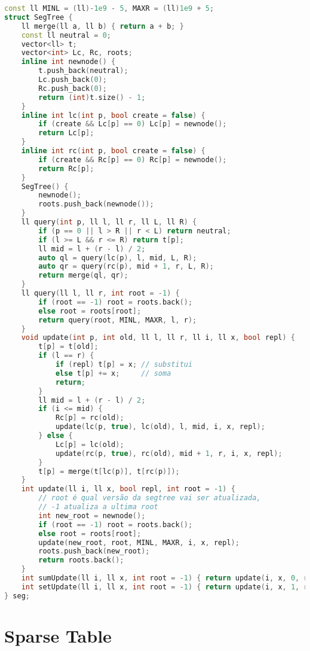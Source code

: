 \documentclass[10pt, a4paper, oneside]{book}
\begin{document}
\begin{lstlisting}[language=C++]
const ll MINL = (ll)-1e9 - 5, MAXR = (ll)1e9 + 5;
struct SegTree {
    ll merge(ll a, ll b) { return a + b; }
    const ll neutral = 0;
    vector<ll> t;
    vector<int> Lc, Rc, roots;
    inline int newnode() {
        t.push_back(neutral);
        Lc.push_back(0);
        Rc.push_back(0);
        return (int)t.size() - 1;
    }
    inline int lc(int p, bool create = false) {
        if (create && Lc[p] == 0) Lc[p] = newnode();
        return Lc[p];
    }
    inline int rc(int p, bool create = false) {
        if (create && Rc[p] == 0) Rc[p] = newnode();
        return Rc[p];
    }
    SegTree() {
        newnode();
        roots.push_back(newnode());
    }
    ll query(int p, ll l, ll r, ll L, ll R) {
        if (p == 0 || l > R || r < L) return neutral;
        if (l >= L && r <= R) return t[p];
        ll mid = l + (r - l) / 2;
        auto ql = query(lc(p), l, mid, L, R);
        auto qr = query(rc(p), mid + 1, r, L, R);
        return merge(ql, qr);
    }
    ll query(ll l, ll r, int root = -1) {
        if (root == -1) root = roots.back();
        else root = roots[root];
        return query(root, MINL, MAXR, l, r);
    }
    void update(int p, int old, ll l, ll r, ll i, ll x, bool repl) {
        t[p] = t[old];
        if (l == r) {
            if (repl) t[p] = x; // substitui
            else t[p] += x;     // soma
            return;
        }
        ll mid = l + (r - l) / 2;
        if (i <= mid) {
            Rc[p] = rc(old);
            update(lc(p, true), lc(old), l, mid, i, x, repl);
        } else {
            Lc[p] = lc(old);
            update(rc(p, true), rc(old), mid + 1, r, i, x, repl);
        }
        t[p] = merge(t[lc(p)], t[rc(p)]);
    }
    int update(ll i, ll x, bool repl, int root = -1) {
        // root é qual versão da segtree vai ser atualizada,
        // -1 atualiza a ultima root
        int new_root = newnode();
        if (root == -1) root = roots.back();
        else root = roots[root];
        update(new_root, root, MINL, MAXR, i, x, repl);
        roots.push_back(new_root);
        return roots.back();
    }
    int sumUpdate(ll i, ll x, int root = -1) { return update(i, x, 0, root); }
    int setUpdate(ll i, ll x, int root = -1) { return update(i, x, 1, root); }
} seg;
\end{lstlisting}
\hfill

\section{Sparse Table}
\end{document}
